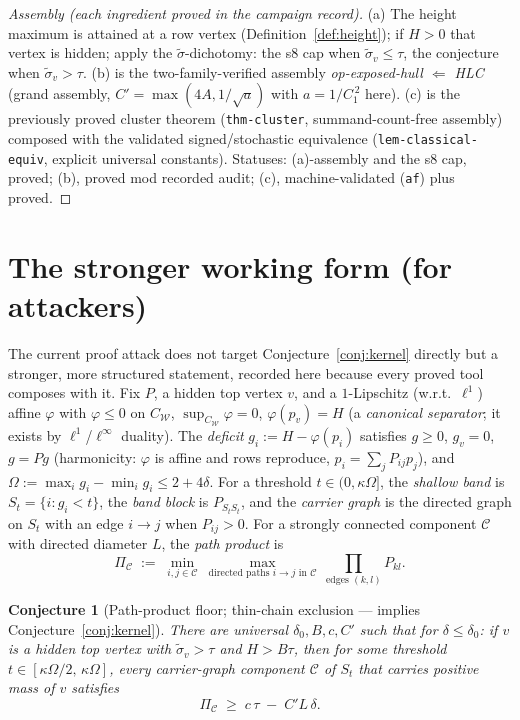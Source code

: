 \documentclass[11pt]{article}
\theoremstyle{plain}
\newtheorem{conjecture}{Conjecture}
\theoremstyle{definition}
\theoremstyle{remark}
\newcommand{\W}{\mathcal W}
\newcommand{\sigt}{\widetilde{\sigma}}
\begin{document}
\begin{proof}[Assembly (each ingredient proved in the campaign record)]
(a) The height maximum is attained at a row vertex (Definition~\ref{def:height}); if
$H>0$ that vertex is hidden; apply the $\sigt$-dichotomy: the s8 cap when
$\sigt_v\le\tau$, the conjecture when $\sigt_v>\tau$. (b) is the two-family-verified
assembly \emph{op-exposed-hull $\Leftarrow$ HLC} (grand assembly, $C'=\max(4A,1/\sqrt a)$
with $a=1/C_1^{\,2}$ here). (c) is the previously proved cluster theorem
(\texttt{thm-cluster}, summand-count-free assembly) composed with the validated
signed/stochastic equivalence (\texttt{lem-classical-equiv}, explicit universal
constants). Statuses: (a)-assembly and the s8 cap, proved; (b), proved mod recorded
audit; (c), machine-validated (\texttt{af}) plus proved.
\end{proof}

\section{The stronger working form (for attackers)}\label{sec:stronger}

The current proof attack does not target Conjecture~\ref{conj:kernel} directly but a
stronger, more structured statement, recorded here because every proved tool composes
with it. Fix $P$, a hidden top vertex $v$, and a $1$-Lipschitz (w.r.t.\ $\ell^1$) affine
$\varphi$ with $\varphi\le 0$ on $C_\W$, $\sup_{C_\W}\varphi=0$, $\varphi(p_v)=H$
(a \emph{canonical separator}; it exists by $\ell^1$/$\ell^\infty$ duality). The
\emph{deficit} $g_i:=H-\varphi(p_i)$ satisfies $g\ge0$, $g_v=0$, $g=Pg$ (harmonicity:
$\varphi$ is affine and rows reproduce, $p_i=\sum_j P_{ij}p_j$), and
$\Omega:=\max_i g_i-\min_i g_i\le 2+4\delta$. For a threshold $t\in(0,\kappa\Omega]$,
the \emph{shallow band} is $S_t=\{i: g_i<t\}$, the \emph{band block} is
$P_{S_tS_t}$, and the \emph{carrier graph} is the directed graph on $S_t$ with an edge
$i\to j$ when $P_{ij}>0$. For a strongly connected component $\mathcal C$ with directed
diameter $L$, the \emph{path product} is
\[
\Pi_{\mathcal C}\;:=\;\min_{i,j\in\mathcal C}\ \max_{\text{directed paths } i\to j
\text{ in }\mathcal C}\ \prod_{\text{edges } (k,l)} P_{kl}.
\]

\begin{conjecture}[Path-product floor; thin-chain exclusion --- implies
Conjecture~\ref{conj:kernel}]\label{conj:floor}
There are universal $\delta_0,B,c,C'$ such that for $\delta\le\delta_0$: if $v$ is a
hidden top vertex with $\sigt_v>\tau$ and $H>B\tau$, then for some threshold
$t\in[\kappa\Omega/2,\,\kappa\Omega]$, every carrier-graph component $\mathcal C$ of
$S_t$ that carries positive mass of $v$ satisfies
\[
\Pi_{\mathcal C}\;\ge\; c\,\tau \;-\; C' L\,\delta .
\]
\end{conjecture}
\end{document}
